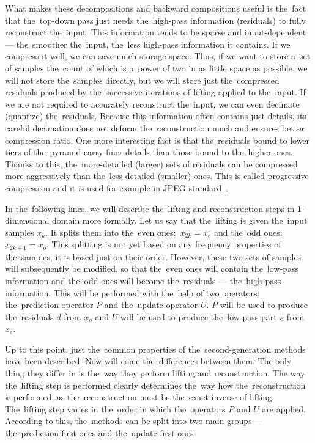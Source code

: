 What makes these decompositions and backward compositions useful is the~fact that the~top-down pass just needs the~high-pass information (residuals) to fully reconstruct the~input. This information tends to be sparse and input-dependent --- the~smoother the~input, the~less high-pass information it contains. If we compress it well, we can save much storage space. Thus, if we want to store a~set of samples the~count of which is a~power of two in as little space as possible, we will not store the~samples directly, but we will store just the~compressed residuals produced by the~successive iterations of lifting applied to the~input. If we are not required to accurately reconstruct the~input, we can even decimate (quantize) the~residuals. Because this information often contains just details, its careful decimation does not deform the~reconstruction much and ensures better compression ratio. One more interesting fact is that the~residuals bound to lower tiers of the~pyramid carry finer details than those bound to the~higher ones. Thanks to this, the~more-detailed (larger) sets of residuals can be compressed more aggressively than the~less-detailed (smaller) ones. This is called progressive compression and it is used for example in JPEG standard~\cite{jpeg}.

In the~following lines, we will describe the~lifting and reconstruction steps in 1-dimensional domain more formally.
Let us say that the~lifting is given the~input samples $x_k$. It splits them into the~even ones:~$x_{2k} = x_e$ and the~odd ones:~$x_{2k+1} = x_o$. This splitting is not yet based on any frequency properties of the~samples, it is based just on their order. However, these two sets of samples will subsequently be modified, so that the~even ones will contain the~low-pass information and the~odd ones will become the~residuals --- the~high-pass information. This will be performed with the~help of two operators: the~prediction operator $P$ and the~update operator $U$. $P$ will be used to produce the~residuals $d$ from $x_o$ and $U$ will be used to produce the~low-pass part $s$ from $x_e$.

Up to this point, just the~common properties of the~second-generation methods have been described. Now will come the~differences between them. The only thing they differ in is the~way they perform lifting and reconstruction. The way the~lifting step is performed clearly determines the~way how the~reconstruction is performed, as the~reconstruction must be the~exact inverse of lifting. The~lifting step varies in the~order in which the~operators $P$ and $U$ are applied. According to this, the~methods can be split into two main groups --- the~prediction-first ones and the~update-first ones.

